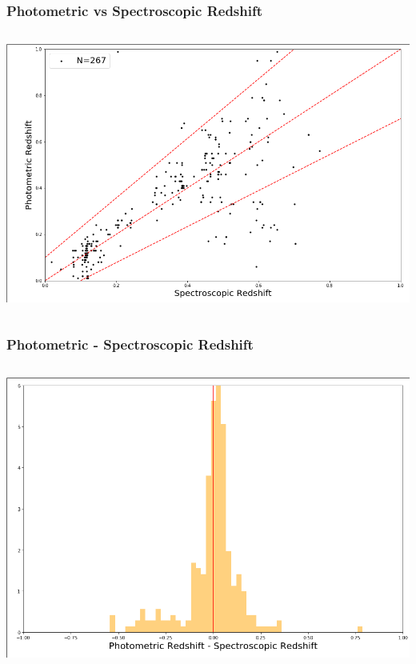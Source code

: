 \documentclass{beamer}
\begin{document}
\begin{frame}
    \frametitle{Photometric vs Spectroscopic Redshift}
\begin{columns}
	\begin{column}{10cm}
		\includegraphics[width=\columnwidth]{vs.png} 
	\end{column}
\end{columns}
\end{frame}

\begin{frame}
    \frametitle{Photometric - Spectroscopic Redshift}
\begin{columns}
	\begin{column}{10cm}
		\includegraphics[width=\columnwidth]{hist.png} 
	\end{column}
\end{columns}
\end{frame}
\end{document}
